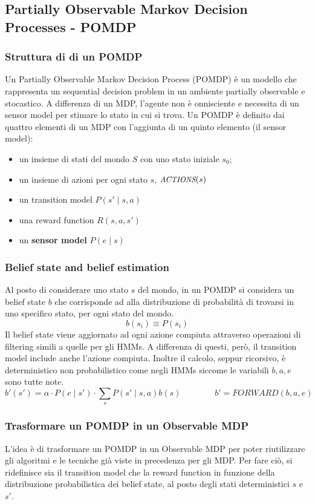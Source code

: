 \subsection{Partially Observable Markov Decision Processes - POMDP}
\subsubsection*{Struttura di di un POMDP}
Un Partially Observable Markov Decision Process (POMDP) è un modello che rappresenta un sequential decision problem in un
ambiente partially observable e stocastico. A differenza di un MDP, l'agente non è onnisciente e necessita di un sensor
model per stimare lo stato in cui si trova. Un POMDP è definito dai quattro elementi di un MDP con l'aggiunta di un quinto
elemento (il sensor model):
\begin{itemize}
	\item un insieme di stati del mondo \(S\) con uno stato iniziale \(s_0\);
	\item un insieme di azioni per ogni stato \(s\), \(\textit{\small ACTIONS}(s)\)
	\item un transition model \(P(s' \mid s, a)\)
	\item una reward function \(R(s,a,s')\)
	\item un \textbf{sensor model} \(P(e \mid s)\)
\end{itemize}

\subsubsection*{Belief state and belief estimation}
Al posto di considerare uno stato \(s\) del mondo, in un POMDP si considera un belief state \(b\) che corrisponde ad alla
distribuzione di probabilità di trovarsi in uno specifico stato, per ogni stato del mondo.
\[b(s_i) \equiv P(s_i)\]
Il belief state viene aggiornato ad ogni azione compiuta attraverso operazioni di filtering simili a quelle per gli HMMs.
A differenza di questi, però, il transition model include anche l'azione compiuta. Inoltre il calcolo, seppur ricorsivo, è
deterministico non probabilistico come negli HMMs siccome le variabili \(b, a, e\) sono tutte note.
\[b'(s') = \alpha \cdot P(e \mid s') \cdot \sum_s P(s' \mid s, a) b(s) \qquad\qquad b' = \textit{FORWARD}(b, a, e)\]

\subsubsection*{Trasformare un POMDP in un Observable MDP}
L'idea è di trasformare un POMDP in un Observable MDP per poter riutilizzare gli algoritmi e le tecniche già viste in precedenza
per gli MDP. Per fare ciò, si ridefinisce sia il transition model che la reward function in funzione della distribuzione
probabilistica dei belief state, al posto degli stati deterministici \(s\) e \(s'\).

